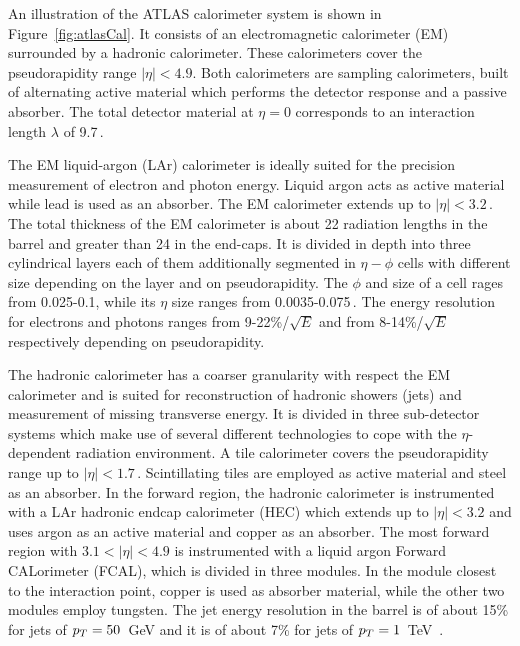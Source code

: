 An illustration of the ATLAS calorimeter system is shown in Figure~\ref{fig:atlasCal}. It consists of an electromagnetic calorimeter (EM) 
surrounded by a hadronic calorimeter.  These calorimeters cover the pseudorapidity 
range $|\eta| < 4.9$.
%
Both  calorimeters are sampling calorimeters, built of alternating
active material which performs the detector response and a passive absorber.
The total detector material  at $\eta = 0$ corresponds to an interaction length $\lambda$ of 9.7$\,.$ 

The EM liquid-argon (LAr) calorimeter is ideally suited for the precision measurement of electron and photon
energy. Liquid argon acts as  active material while lead is used as an absorber. The EM calorimeter extends up to $|\eta| < 3.2\,.$
The total thickness of the EM calorimeter is about 22 radiation lengths in the barrel and greater than 24 in the
end-caps. It is divided in depth into three cylindrical layers each of them additionally segmented in $\eta-\phi$ cells with 
different size depending on the layer and on pseudorapidity. The $\phi$ and size of a cell rages from  0.025-0.1, while its $\eta$ size ranges 
from 0.0035-0.075\,.
The energy resolution for electrons and photons ranges from 9-22\%/$\sqrt{E}$ and from 8-14\%/$\sqrt{E}$ respectively depending on
pseudorapidity.

The hadronic calorimeter has a coarser granularity with respect the EM calorimeter and  is suited  for
reconstruction of hadronic showers (jets) and measurement of missing transverse energy. It 
is divided in three sub-detector systems which make use of several different technologies to cope 
with the $\eta$-dependent radiation environment. A tile calorimeter covers the pseudorapidity range up to $|\eta| < 1.7\,$. 
Scintillating tiles are employed as active material and steel as an absorber. 
In the forward region, the hadronic calorimeter is instrumented with a LAr hadronic endcap calorimeter (HEC)
which extends up to $|\eta| < 3.2$ and uses argon as an active material and copper as an absorber. 
The most forward region with  $3.1 <|\eta| < 4.9$ is instrumented  with a 
liquid argon Forward CALorimeter (FCAL), 
which is divided in three modules. In the module closest to the interaction point, copper is used as absorber material, 
while the other two modules employ tungsten.
The jet energy resolution in the barrel is of about 15\% for jets of $p_{T}=50$~GeV and it is of about 7\% for jets of $p_{T}=1$~TeV~\cite{jer}.


